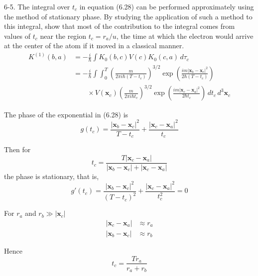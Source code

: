 \documentclass[12pt]{article}
\begin{document}
6-5.
The integral over $t_c$ in equation (6.28) can be performed
approximately using the method of stationary phase.
By studying the application of such a method to this integral,
show that most of the contribution to the integral comes from
values of $t_c$ near the region $t_c=r_a/u$, the time at which
the electron would arrive at the center of the atom if it
moved in a classical manner.
\begin{align*}
K^{(1)}(b,a)&=-\frac{i}{\hbar}\int K_0(b,c)V(c)K_0(c,a)\,d\tau_c
\\
&=-\frac{i}{\hbar}\int\int_0^T
\left(\frac{m}{2\pi i\hbar(T-t_c)}\right)^{3/2}
\exp\left(\frac{im|\mathbf x_b-\mathbf x_c|^2}{2\hbar(T-t_c)}\right)
\\
&\qquad{}\times
V(\mathbf x_c)
\left(\frac{m}{2\pi i\hbar t_c}\right)^{3/2}
\exp\left(\frac{im|\mathbf x_c-\mathbf x_a|^2}{2\hbar t_c}\right)
\,dt_c\,d^3\mathbf x_c
\tag{6.28}
\end{align*}

The phase of the exponential in (6.28) is
\begin{equation*}
g(t_c)=
\frac{|\mathbf x_b-\mathbf x_c|^2}{T-t_c}
+
\frac{|\mathbf x_c-\mathbf x_a|^2}{t_c}
\end{equation*}

Then for
\begin{equation*}
t_c=\frac{T|\mathbf x_c-\mathbf x_a|}{|\mathbf x_b-\mathbf x_c|+|\mathbf x_c-\mathbf x_a|}
\end{equation*}
the phase is stationary, that is,
\begin{equation*}
g'(t_c)=
\frac{|\mathbf x_b-\mathbf x_c|^2}{(T-t_c)^2}
+
\frac{|\mathbf x_c-\mathbf x_a|^2}{t_c^2}
=0
\end{equation*}

For $r_a$ and $r_b\gg|\mathbf x_c|$
\begin{align*}
|\mathbf x_c-\mathbf x_a|&\approx r_a %
\\
|\mathbf x_b-\mathbf x_c|&\approx r_b %
\end{align*}

Hence
\begin{equation*}
t_c=\frac{Tr_a}{r_a+r_b}
\end{equation*}
\end{document}
